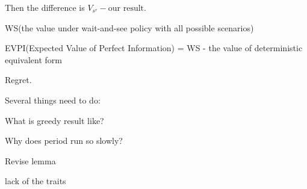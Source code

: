 Then the difference is $V_{s^{r}} - \text{our result}$.

WS(the value under wait-and-see policy with all possible scenarios)

EVPI(Expected Value of Perfect Information) = WS - the value of deterministic equivalent form

Regret.

Several things need to do:

What is greedy result like?

Why does period run so slowly?

Revise lemma

lack of the traits


\newpage
